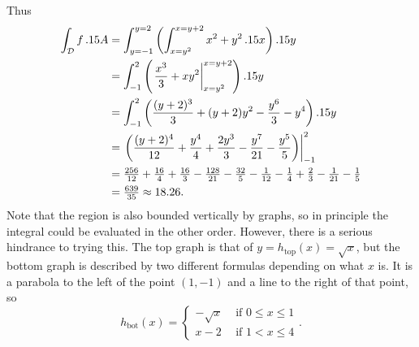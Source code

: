 \begin{example}
	Thus
	\begin{align*}
		\int_{\mathcal D} f\, .15 A &= 
		\int_{y=-1}^{y=2}\left(\int_{x = y^2}^{x=y+2} x^2 + y^2\, .15 x\right) .15 y \\
	   &=\int_{-1}^2 \left( \left.\frac{x^3}3 + xy^2\right|_{x=y^2}^{x=y+2}\right) .15 y \\
	   &=\int_{-1}^2 \left(\frac {(y + 2)^3}3 + (y + 2)y^2 -
	    \frac{y^6}3 - y^4 \right) .15 y \\
	   &=\left. \left(\frac {(y + 2)^4}{12} + \frac{y^4}4 + \frac{2y^3}3 -
	    \frac{y^7}{21} - \frac{y^5}5 \right)\right|_{-1}^2 \\
	   &=\tfrac{256}{12} + \tfrac{16}4 + \tfrac{16}3 - \tfrac{128}{21} - \tfrac{32}5
	     - \tfrac 1{12} - \tfrac 14 + \tfrac 23 - \tfrac 1{21} - \tfrac 15 \\
	   &=\tfrac{639}{35} \approx 18.26.
	\end{align*}
	Note that the region is also bounded vertically by graphs, so in
	principle the integral could be evaluated in the other order.
	However, there is a serious hindrance to trying this.
	The top graph is that of  $y = h_{\text{top}}(x) = \sqrt x$,
	 but the bottom
	graph is described by two different formulas depending on what $x$
	is.  It is a parabola to the left of the point $(1,-1)$ and a line
	to the right of that point, so  
	\[
		h_{\text{bot}}(x) = \begin{cases}
			-\sqrt{x} & \text{ if }0\leq x\leq 1\\
			x-2 &\text{ if }1 < x\leq 4
			\end{cases}.
	\]

\begin{center}
	\usetikzlibrary{patterns,decorations.pathreplacing}
\end{center}
\end{example}
